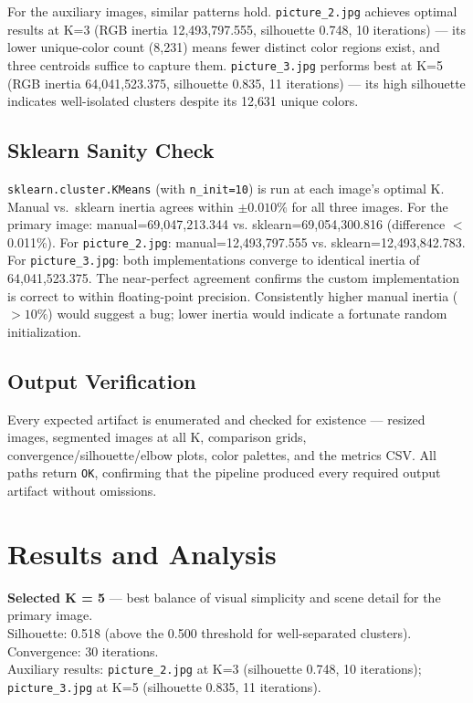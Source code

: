 For the auxiliary images, similar patterns hold. \texttt{picture\_2.jpg} achieves optimal results at K=3 (RGB inertia 12{,}493{,}797.555, silhouette 0.748, 10 iterations) — its lower unique-color count (8{,}231) means fewer distinct color regions exist, and three centroids suffice to capture them. \texttt{picture\_3.jpg} performs best at K=5 (RGB inertia 64{,}041{,}523.375, silhouette 0.835, 11 iterations) — its high silhouette indicates well-isolated clusters despite its 12{,}631 unique colors.

\subsection{Sklearn Sanity Check}
\texttt{sklearn.cluster.KMeans} (with \texttt{n\_init=10}) is run at each image's optimal K. Manual vs.\ sklearn inertia agrees within $\pm 0.010\%$ for all three images. For the primary image: manual=69{,}047{,}213.344 vs. sklearn=69{,}054{,}300.816 (difference $<$ 0.011\%). For \texttt{picture\_2.jpg}: manual=12{,}493{,}797.555 vs. sklearn=12{,}493{,}842.783. For \texttt{picture\_3.jpg}: both implementations converge to identical inertia of 64{,}041{,}523.375. The near-perfect agreement confirms the custom implementation is correct to within floating-point precision. Consistently higher manual inertia ($>10\%$) would suggest a bug; lower inertia would indicate a fortunate random initialization.

\subsection{Output Verification}
Every expected artifact is enumerated and checked for existence — resized images, segmented images at all K, comparison grids, convergence/silhouette/elbow plots, color palettes, and the metrics CSV. All paths return \texttt{OK}, confirming that the pipeline produced every required output artifact without omissions.

\section{Results and Analysis}

\begin{resultbox}
\textbf{Selected K = 5} — best balance of visual simplicity and scene detail for the primary image.\\
Silhouette: 0.518 (above the 0.500 threshold for well-separated clusters). Convergence: 30 iterations.\\
Auxiliary results: \texttt{picture\_2.jpg} at K=3 (silhouette 0.748, 10 iterations); \texttt{picture\_3.jpg} at K=5 (silhouette 0.835, 11 iterations).
\end{resultbox}

